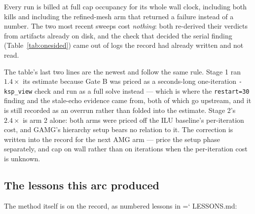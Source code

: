 \documentclass[11pt,a4paper]{article}
\newcommand{\artifact}[1]{{\small\ttfamily\hyphenchar\font=`\-\relax
  \def\_{\textunderscore\allowbreak}#1}}
\begin{document}
Every run is billed at full cap occupancy for its whole wall clock, including both kills and
including the refined-mesh arm that returned a failure instead of a number. The two most
recent sweeps cost \emph{nothing}: both re-derived their verdicts from artifacts already on
disk, and the check that decided the serial finding (Table~\ref{tab:onesided}) came out of
logs the record had already written and not read.

The table's last two lines are the newest and follow the same rule. Stage 1 ran \(1.4\times\) its
estimate because Gate B was priced as a seconds-long one-iteration \texttt{-ksp\_view} check and
run as a full solve instead --- which is where the \texttt{restart=30} finding and the stale-echo
evidence came from, both of which go upstream, and it is still recorded as an overrun rather than
folded into the estimate. Stage 2's \(2.4\times\) is arm 2 alone: both arms were priced off the
ILU baseline's per-iteration cost, and GAMG's hierarchy setup bears no relation to it. The
correction is written into the record for the next AMG arm --- price the setup phase separately,
and cap on wall rather than on iterations when the per-iteration cost is unknown.

\subsection{The lessons this arc produced}

The method itself is on the record, as numbered lessons in \artifact{LESSONS.md}:
\end{document}
